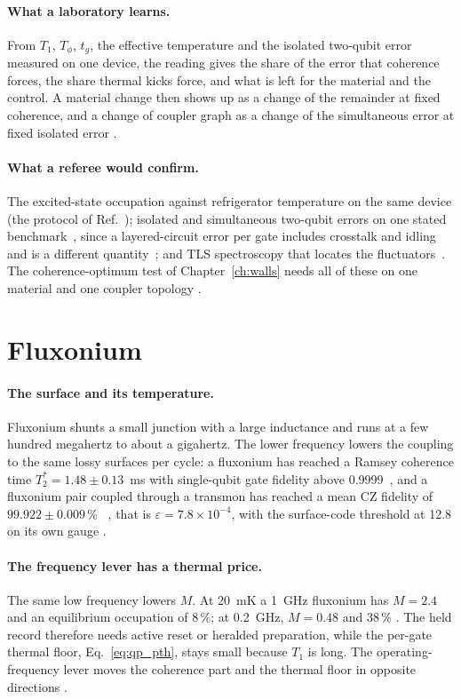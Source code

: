 \paragraph{What a laboratory learns.} From $T_1$, $T_\phi$, $t_g$, the effective temperature and the isolated two-qubit error measured on
one device, the reading gives the share of the error that coherence forces, the share thermal kicks force, and what is left for the
material and the control. A material change then shows up as a change of the remainder at fixed coherence, and a change of coupler
graph as a change of the simultaneous error at fixed isolated error \interp.

\paragraph{What a referee would confirm.} The excited-state occupation against refrigerator temperature on the same device (the
protocol of Ref.~\cite{Jin2015}); isolated and simultaneous two-qubit errors on one stated benchmark~\cite{Proctor2022}, since a
layered-circuit error per gate includes crosstalk and idling and is a different quantity~\cite{McKay2023}; and TLS spectroscopy that
locates the fluctuators~\cite{Lisenfeld2019,Lisenfeld2025}. The coherence-optimum test of Chapter~\ref{ch:walls} needs all of these on
one material and one coupler topology \openprob.

\section{Fluxonium}\label{sec:qp_fluxonium}
\paragraph{The surface and its temperature.} Fluxonium shunts a small junction with a large inductance and runs at a few hundred
megahertz to about a gigahertz. The lower frequency lowers the coupling to the same lossy surfaces per cycle: a fluxonium has reached a
Ramsey coherence time $T_2^*=1.48\pm0.13$~ms with single-qubit gate fidelity above 0.9999~\cite{Somoroff2023}, and a fluxonium pair coupled
through a transmon has reached a mean CZ fidelity of $99.922\pm0.009$\,\%~\cite{Ding2023} \observed, that is $\varepsilon=7.8\times10^{-4}$,
with the surface-code threshold at 12.8 on its own gauge \calc.

\paragraph{The frequency lever has a thermal price.} The same low frequency lowers $M$. At 20~mK a 1~GHz fluxonium has $M=2.4$ and an
equilibrium occupation of 8\,\%; at 0.2~GHz, $M=0.48$ and 38\,\% \calc. The held record therefore needs active reset or heralded
preparation, while the per-gate thermal floor, Eq.~\eqref{eq:qp_pth}, stays small because $T_1$ is long. The operating-frequency lever
moves the coherence part and the thermal floor in opposite directions \derived.

